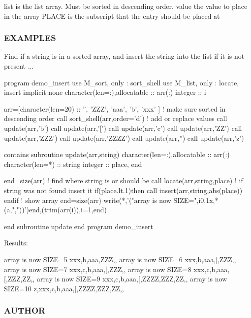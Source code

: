 \begin{DoxyVerb}list    is the list array. Must be sorted in descending order.
value   the value to place in the array
PLACE   is the subscript that the entry should be placed at
\end{DoxyVerb}


\subsubsection*{E\+X\+A\+M\+P\+L\+ES}

Find if a string is in a sorted array, and insert the string into the list if it is not present ... \begin{DoxyVerb}program demo_insert
use M_sort, only : sort_shell
use M_list, only : locate, insert
implicit none
character(len=:),allocatable :: arr(:)
integer                       :: i

arr=[character(len=20) :: '', 'ZZZ', 'aaa', 'b', 'xxx' ]
! make sure sorted in descending order
call sort_shell(arr,order='d')
! add or replace values
call update(arr,'b')
call update(arr,'[')
call update(arr,'c')
call update(arr,'ZZ')
call update(arr,'ZZZ')
call update(arr,'ZZZZ')
call update(arr,'')
call update(arr,'z')

contains
subroutine update(arr,string)
character(len=:),allocatable :: arr(:)
character(len=*)             :: string
integer                      :: place, end

end=size(arr)
! find where string is or should be
call locate(arr,string,place)
! if string was not found insert it
if(place.lt.1)then
   call insert(arr,string,abs(place))
endif
! show array
end=size(arr)
write(*,'("array is now SIZE=",i0,1x,*(a,","))')end,(trim(arr(i)),i=1,end)

end subroutine update
end program demo_insert
\end{DoxyVerb}


Results\+:

array is now S\+I\+ZE=5 xxx,b,aaa,Z\+ZZ,, array is now S\+I\+ZE=6 xxx,b,aaa,\mbox{[},Z\+ZZ,, array is now S\+I\+ZE=7 xxx,c,b,aaa,\mbox{[},Z\+ZZ,, array is now S\+I\+ZE=8 xxx,c,b,aaa,\mbox{[},Z\+ZZ,ZZ,, array is now S\+I\+ZE=9 xxx,c,b,aaa,\mbox{[},Z\+Z\+ZZ,Z\+ZZ,ZZ,, array is now S\+I\+ZE=10 z,xxx,c,b,aaa,\mbox{[},Z\+Z\+ZZ,Z\+ZZ,ZZ,,

\subsubsection*{A\+U\+T\+H\+OR}

